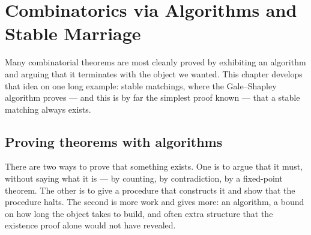 
\chapter[Combinatorics via Algorithms]{Combinatorics via Algorithms and Stable Marriage}
\label{ch:stable-marriage}

Many combinatorial theorems are most cleanly proved by exhibiting an algorithm
and arguing that it terminates with the object we wanted. This chapter develops
that idea on one long example: stable matchings, where the Gale--Shapley
algorithm proves --- and this is by far the simplest proof known --- that a
stable matching
always exists.

\begin{goals}
\end{goals}

\section{Proving theorems with algorithms}
\label{sec:combinatorics-via-algorithms}

There are two ways to prove that something exists. One is to argue that it must,
without saying what it is --- by counting, by contradiction, by a fixed-point
theorem. The other is to give a procedure that constructs it and show that the
procedure halts. The second is more work and gives more: an algorithm, a bound
on how long the object takes to build, and often extra structure that the
existence proof alone would not have revealed.

